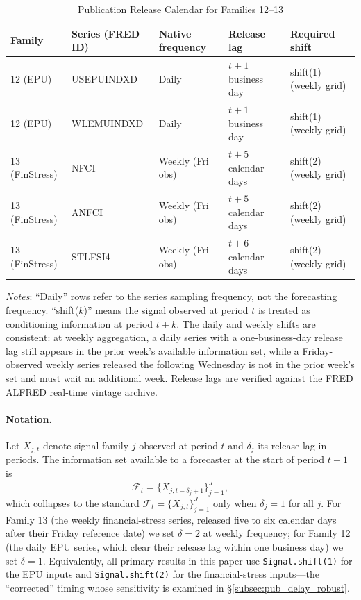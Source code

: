 \documentclass[12pt,a4paper]{article}
\begin{document}
\begin{table}[H]
\centering
\small
\caption{Publication Release Calendar for Families 12--13}
\label{tab:pub_delay_calendar}
\begin{threeparttable}
\begin{tabular}{@{}lllll@{}}
\toprule
Family & Series (FRED ID) & Native frequency & Release lag & Required shift \\
\midrule
12 (EPU) & USEPUINDXD & Daily & $t+1$ business day & shift(1) (weekly grid) \\
12 (EPU) & WLEMUINDXD & Daily & $t+1$ business day & shift(1) (weekly grid) \\
13 (FinStress) & NFCI & Weekly (Fri obs) & $t+5$ calendar days & shift(2) (weekly grid) \\
13 (FinStress) & ANFCI & Weekly (Fri obs) & $t+5$ calendar days & shift(2) (weekly grid) \\
13 (FinStress) & STLFSI4 & Weekly (Fri obs) & $t+6$ calendar days & shift(2) (weekly grid) \\
\bottomrule
\end{tabular}
\begin{tablenotes}
\small
\item \textit{Notes}: ``Daily'' rows refer to the series sampling frequency, not the forecasting frequency. ``shift($k$)'' means the signal observed at period $t$ is treated as conditioning information at period $t+k$. The daily and weekly shifts are consistent: at weekly aggregation, a daily series with a one-business-day release lag still appears in the prior week's available information set, while a Friday-observed weekly series released the following Wednesday is not in the prior week's set and must wait an additional week. Release lags are verified against the FRED ALFRED real-time vintage archive.
\end{tablenotes}
\end{threeparttable}
\end{table}

\paragraph{Notation.} Let $X_{j,t}$ denote signal family $j$ observed at period $t$ and $\delta_j$ its release lag in periods. The information set available to a forecaster at the start of period $t+1$ is
\begin{equation}
\mathcal{F}_t = \{X_{j,t-\delta_j+1}\}_{j=1}^{J},
\label{eq:info_set_pub_delay}
\end{equation}
which collapses to the standard $\mathcal{F}_t = \{X_{j,t}\}_{j=1}^J$ only when $\delta_j = 1$ for all $j$. For Family 13 (the weekly financial-stress series, released five to six calendar days after their Friday reference date) we set $\delta = 2$ at weekly frequency; for Family 12 (the daily EPU series, which clear their release lag within one business day) we set $\delta = 1$. Equivalently, all primary results in this paper use \texttt{Signal.shift(1)} for the EPU inputs and \texttt{Signal.shift(2)} for the financial-stress inputs---the ``corrected'' timing whose sensitivity is examined in \S\ref{subsec:pub_delay_robust}.
\end{document}
